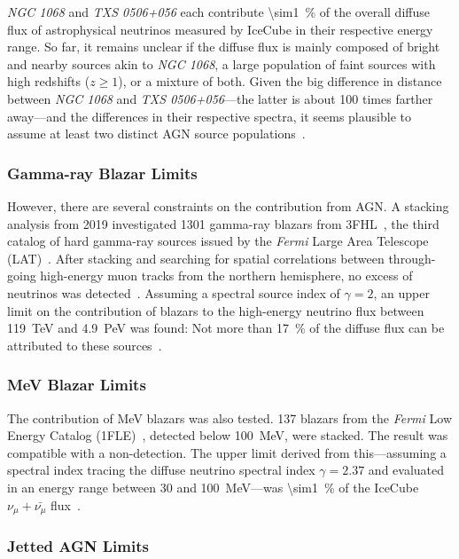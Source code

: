 \textit{NGC 1068} and \textit{TXS 0506+056} each contribute \SI{\sim1}{\percent} of the overall diffuse flux of astrophysical neutrinos measured by IceCube in their respective energy range. So far, it remains unclear if the diffuse flux is mainly composed of bright and nearby sources akin to \emph{NGC 1068}, a large population of faint sources with high redshifts ($z \geq 1$), or a mixture of both. Given the big difference in distance between \emph{NGC 1068} and \emph{TXS 0506+056}---the latter is about 100 times farther away---and the differences in their respective spectra, it seems plausible to assume at least two distinct AGN source populations~\cite{Abbasi2022}.

\subsubsection{Gamma-ray Blazar Limits}
However, there are several constraints on the contribution from AGN\@. A stacking analysis from 2019 investigated 1301 gamma-ray blazars from 3FHL~, the third catalog of hard gamma-ray sources issued by the \textit{Fermi} Large Area Telescope (LAT)~. After stacking and searching for spatial correlations between through-going high-energy muon tracks from the northern hemisphere, no excess of neutrinos was detected~. Assuming a spectral source index of $\gamma=2$, an upper limit on the contribution of blazars to the high-energy neutrino flux between \SI{119}{\tera\eV} and \SI{4.9}{\peta\eV} was found: Not more than \SI{17}{\percent} of the diffuse flux can be attributed to these sources~.

\subsubsection{MeV Blazar Limits}
The contribution of MeV blazars was also tested. 137 blazars from the \textit{Fermi} Low Energy Catalog (1FLE)~, detected below \SI{100}{\mega\eV}, were stacked. The result was compatible with a non-detection. The upper limit derived from this---assuming a spectral index tracing the diffuse neutrino spectral index $\gamma=2.37$ and evaluated in an energy range between 30 and \SI{100}{\mega\eV}---was \SI{\sim1}{\percent} of the IceCube $\nu_\mu+\bar{\nu_\mu}$ flux~.

\subsubsection{Jetted AGN Limits}

